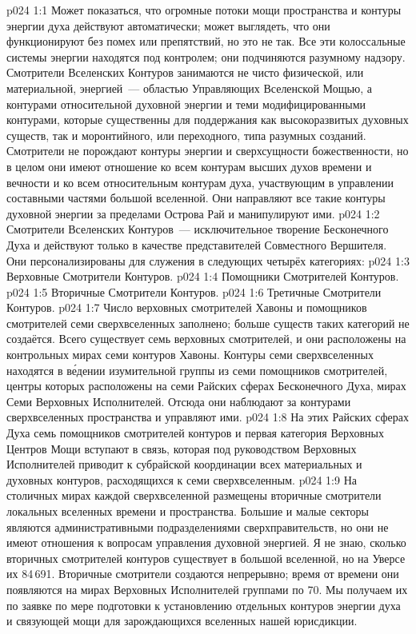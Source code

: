 \vs p024 1:1 Может показаться, что огромные потоки мощи пространства и контуры энергии духа действуют автоматически; может выглядеть, что они функционируют без помех или препятствий, но это не так. Все эти колоссальные системы энергии находятся под контролем; они подчиняются разумному надзору. Смотрители Вселенских Контуров занимаются не чисто физической, или материальной, энергией~--- областью Управляющих Вселенской Мощью, а контурами относительной духовной энергии и теми модифицированными контурами, которые существенны для поддержания как высокоразвитых духовных существ, так и моронтийного, или переходного, типа разумных созданий. Смотрители не порождают контуры энергии и сверхсущности божественности, но в целом они имеют отношение ко всем контурам высших духов времени и вечности и ко всем относительным контурам духа, участвующим в управлении составными частями большой вселенной. Они направляют все такие контуры духовной энергии за пределами Острова Рай и манипулируют ими.
\vs p024 1:2 \pc Смотрители Вселенских Контуров~--- исключительное творение Бесконечного Духа и действуют только в качестве представителей Совместного Вершителя. Они персонализированы для служения в следующих четырёх категориях:
\vs p024 1:3 Верховные Смотрители Контуров.
\vs p024 1:4 Помощники Смотрителей Контуров.
\vs p024 1:5 Вторичные Смотрители Контуров.
\vs p024 1:6 Третичные Смотрители Контуров.
\vs p024 1:7 \pc Число верховных смотрителей Хавоны и помощников смотрителей семи сверхвселенных заполнено; больше существ таких категорий не создаётся. Всего существует семь верховных смотрителей, и они расположены на контрольных мирах семи контуров Хавоны. Контуры семи сверхвселенных находятся в в\'едении изумительной группы из семи помощников смотрителей, центры которых расположены на семи Райских сферах Бесконечного Духа, мирах Семи Верховных Исполнителей. Отсюда они наблюдают за контурами сверхвселенных пространства и управляют ими.
\vs p024 1:8 На этих Райских сферах Духа семь помощников смотрителей контуров и первая категория Верховных Центров Мощи вступают в связь, которая под руководством Верховных Исполнителей приводит к субрайской координации всех материальных и духовных контуров, расходящихся к семи сверхвселенным.
\vs p024 1:9 На столичных мирах каждой сверхвселенной размещены вторичные смотрители локальных вселенных времени и пространства. Большие и малые секторы являются административными подразделениями сверхправительств, но они не имеют отношения к вопросам управления духовной энергией. Я не знаю, сколько вторичных смотрителей контуров существует в большой вселенной, но на Уверсе их 84\,691. Вторичные смотрители создаются непрерывно; время от времени они появляются на мирах Верховных Исполнителей группами по 70. Мы получаем их по заявке по мере подготовки к установлению отдельных контуров энергии духа и связующей мощи для зарождающихся вселенных нашей юрисдикции.
